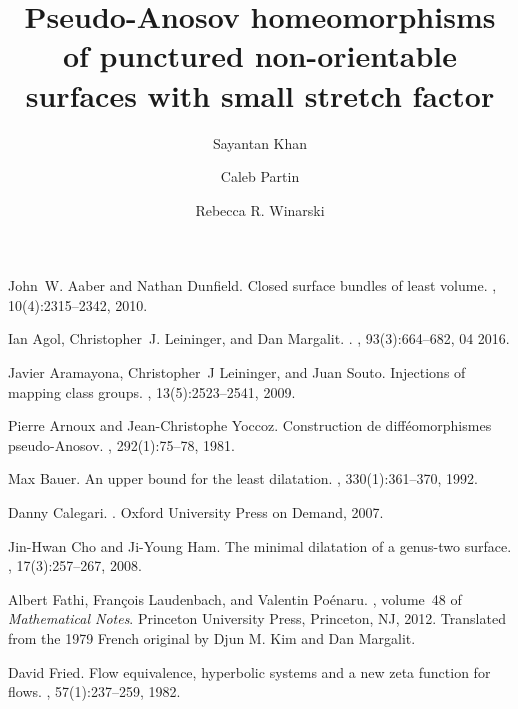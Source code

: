 \documentclass[microtype]{gtpart}     %
\title[Pseudo-Anosov homeomorphisms of non-orientable surfaces]{Pseudo-Anosov homeomorphisms of punctured non-orientable surfaces with small stretch factor}
\author{Sayantan Khan}
\author{Caleb Partin}
\author{Rebecca R. Winarski}
\theoremstyle{definition}
\theoremstyle{definition}
\theoremstyle{definition}
\theoremstyle{remark}
\theoremstyle{definition}
\begin{document}


\maketitle







\begin{thebibliography}{10}

John~W. Aaber and Nathan Dunfield.
\newblock Closed surface bundles of least volume.
, 10(4):2315--2342, 2010.

Ian Agol, Christopher~J. Leininger, and Dan Margalit.
.
, 93(3):664--682, 04
  2016.

Javier Aramayona, Christopher~J Leininger, and Juan Souto.
\newblock Injections of mapping class groups.
, 13(5):2523--2541, 2009.

Pierre Arnoux and Jean-Christophe Yoccoz.
\newblock Construction de diff\'{e}omorphismes pseudo-{A}nosov.
, 292(1):75--78, 1981.

Max Bauer.
\newblock An upper bound for the least dilatation.
, 330(1):361--370, 1992.

Danny Calegari.
.
\newblock Oxford University Press on Demand, 2007.

Jin-Hwan Cho and Ji-Young Ham.
\newblock The minimal dilatation of a genus-two surface.
, 17(3):257--267, 2008.

Albert Fathi, Fran\c{c}ois Laudenbach, and Valentin Po\'{e}naru.
, volume~48 of {\em Mathematical
  Notes}.
\newblock Princeton University Press, Princeton, NJ, 2012.
\newblock Translated from the 1979 French original by Djun M. Kim and Dan
  Margalit.

David Fried.
\newblock Flow equivalence, hyperbolic systems and a new zeta function for
  flows.
, 57(1):237--259, 1982.


\end{thebibliography}
\end{document}
